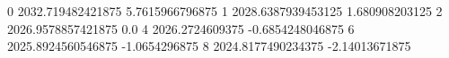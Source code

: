 0 2032.719482421875 5.7615966796875
1 2028.6387939453125 1.680908203125
2 2026.9578857421875 0.0
4 2026.2724609375 -0.6854248046875
6 2025.8924560546875 -1.0654296875
8 2024.8177490234375 -2.14013671875
